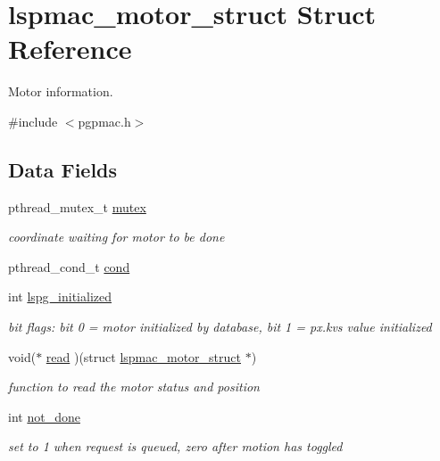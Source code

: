 \hypertarget{structlspmac__motor__struct}{\section{lspmac\-\_\-motor\-\_\-struct Struct Reference}
\label{structlspmac__motor__struct}
}


Motor information.  




{\ttfamily \#include $<$pgpmac.\-h$>$}

\subsection*{Data Fields}
\begin{DoxyCompactItemize}
\item 
pthread\-\_\-mutex\-\_\-t \hyperlink{structlspmac__motor__struct_a188c5b1e991750ce2ffd53e0192e0907}{mutex}
\begin{DoxyCompactList}\small\item\em coordinate waiting for motor to be done \end{DoxyCompactList}\item 
pthread\-\_\-cond\-\_\-t \hyperlink{structlspmac__motor__struct_aa0ea4108b8fed5b41ff91ca7266f3d84}{cond}
\item 
int \hyperlink{structlspmac__motor__struct_af11e5f75c1cf88ed6842d04154d27a31}{lspg\-\_\-initialized}
\begin{DoxyCompactList}\small\item\em bit flags\-: bit 0 = motor initialized by database, bit 1 = px.\-kvs value initialized \end{DoxyCompactList}\item 
void($\ast$ \hyperlink{structlspmac__motor__struct_ac62692eb939c04ca35e939d1c3acfe8f}{read} )(struct \hyperlink{structlspmac__motor__struct}{lspmac\-\_\-motor\-\_\-struct} $\ast$)
\begin{DoxyCompactList}\small\item\em function to read the motor status and position \end{DoxyCompactList}\item 
int \hyperlink{structlspmac__motor__struct_ab7bd8bff48953ce05c758598d75877ac}{not\-\_\-done}
\begin{DoxyCompactList}\small\item\em set to 1 when request is queued, zero after motion has toggled \end{DoxyCompactList}\item 

\end{DoxyCompactItemize}
